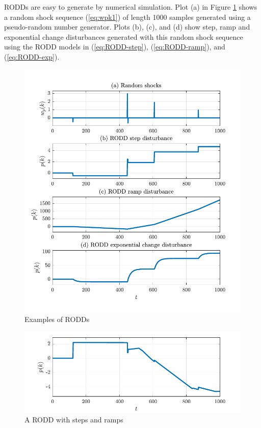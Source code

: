\gls{RODD}s are easy to generate by numerical simulation.  Plot (a) in Figure \ref{fig:rodd-sim-plots} shows a random shock sequence (\ref{eq:wpk1}) of length 1000 samples generated using a pseudo-random number generator. Plots (b), (c), and (d) show step, ramp and exponential change disturbances generated with this random shock sequence using the \gls{RODD} models in (\ref{eq:RODD-step}), (\ref{eq:RODD-ramp}), and (\ref{eq:RODD-exp}). 
\begin{figure}[htp]
	\centering
	\includegraphics[width=13cm]{images/rodd_sim_plots.pdf}
	\caption{Examples of \gls{RODD}s}
	\label{fig:rodd-sim-plots}
\end{figure}
\begin{figure}[htp]
	\centering
	\includegraphics[width=13cm]{images/rodd_sim_plot2.pdf}
	\caption{A \gls{RODD} with steps and ramps}
	\label{fig:rodd-sim-plot2}
\end{figure}


